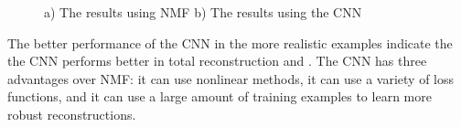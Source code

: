 \documentclass[12pt,chapterheads]{ucsd}
\begin{document}
\begin{figure}[h]
    \begin{minipage}{.5\linewidth}
        \centering
    \end{minipage}%
    \begin{minipage}{.5\linewidth}
        \centering
    \end{minipage}
    \caption{ a) The results using NMF b) The results using the CNN}
    \label{fig:diff_res}
\end{figure}

The better performance of the CNN in the more realistic examples indicate the the CNN performs better in total reconstruction and . The CNN has three advantages over NMF: it can use nonlinear methods, it can use a variety of loss functions, and it can use a large amount of training examples to learn more robust reconstructions.
\end{document}
